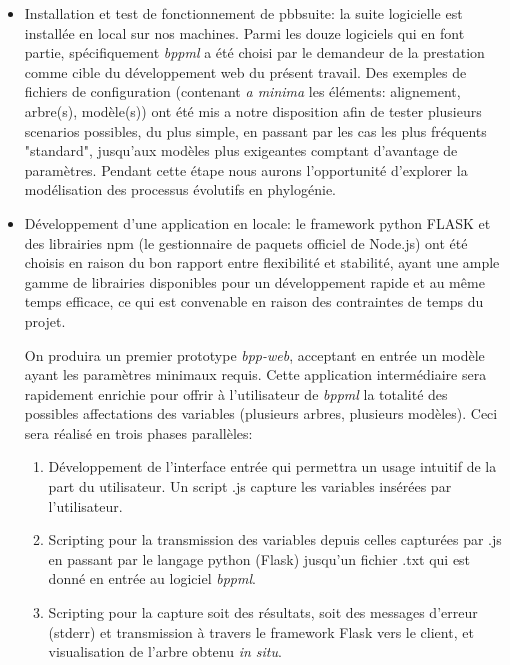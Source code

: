 \begin{itemize}
	\item Installation et test de fonctionnement de pbbsuite: la suite logicielle est installée en local sur nos machines. 
	Parmi les douze logiciels qui en font partie, spécifiquement   \textit{bppml} a été choisi par le demandeur de la prestation comme cible 
	du développement web du présent travail. Des exemples de fichiers de configuration (contenant \textit{a minima} les éléments: alignement, arbre(s), modèle(s)) 
	ont été mis a notre disposition  
	afin de tester plusieurs scenarios possibles, du plus simple, en passant par les cas les plus fréquents "standard", 
	jusqu'aux modèles plus exigeantes comptant d'avantage de paramètres. Pendant cette étape nous aurons l'opportunité d'explorer
	 la modélisation des processus évolutifs en phylogénie.
	
	\item Développement d'une application en locale: le framework python FLASK et des librairies npm
	(le gestionnaire de paquets officiel de Node.js) 
	ont été choisis en raison du bon rapport entre flexibilité et stabilité, 
	ayant une ample gamme de librairies disponibles pour un développement rapide et au même temps efficace, 
	ce qui est convenable en raison des contraintes de temps du projet.

	On produira un premier prototype  \textit{bpp-web}, acceptant en entrée un modèle ayant les paramètres minimaux requis. 
	Cette application intermédiaire sera rapidement enrichie pour offrir à l'utilisateur de \textit{bppml} la totalité des possibles affectations 
	des variables (plusieurs arbres, plusieurs modèles).
	Ceci sera réalisé en trois phases parallèles:
	\begin{enumerate}
		\item Développement de l'interface entrée qui permettra un usage intuitif de la part du utilisateur. 
		Un script .js capture les variables insérées par l'utilisateur. 
		\item Scripting pour la transmission des variables depuis celles capturées par .js en passant par le langage 
		python (Flask) jusqu'un fichier .txt qui est donné en entrée au logiciel \textit{bppml}.
		\item Scripting pour la capture soit des résultats, soit des messages d'erreur (stderr) et transmission à travers 
		le framework Flask vers le client, et visualisation de l'arbre obtenu \textit{in situ}. 
	\end{enumerate}
	

\end{itemize}
